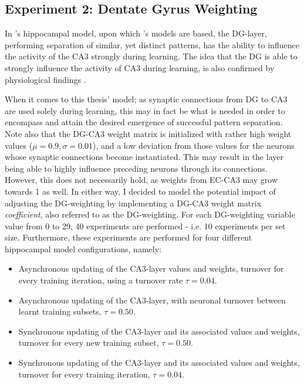 \subsection{Experiment 2: Dentate Gyrus Weighting}

In \citeauthor{Wakagi2008}'s \citeyear{Wakagi2008} hippocampal model, upon which \citeauthor{Hattori2010}'s \citeyear{Hattori2010, Hattori2014} models are based, the DG-layer, performing separation of similar, yet distinct patterns, has the ability to influence the activity of the CA3 strongly during learning. The idea that the DG is able to strongly influence the activity of CA3 during learning, is also confirmed by physiological findings \citep{Rolls1998chpt6}. 

When it comes to this thesis' model; as synaptic connections from DG to CA3 are used solely during learning, this may in fact be what is needed in order to encompass and attain the desired emergence of successful pattern separation. Note also that the DG-CA3 weight matrix is initialized with rather high weight values ($\mu=0.9, \sigma=0.01$), and a low deviation from those values for the neurons whose synaptic connections become instantiated. This may result in the layer being able to highly influence preceding neurons through its connections. However, this does not necessarily hold, as weights from EC-CA3 may grow towards 1 as well. In either way, I decided to model the potential impact of adjusting the DG-weighting by implementing a DG-CA3 weight matrix \textit{coefficient}, also referred to as the DG-weighting. For each DG-weighting variable value from 0 to 29, 40 experiments are performed - i.e. 10 experiments per set size. Furthermore, these experiments are performed for four different hippocampal model configurations, namely:

\begin{itemize}  
\item Asynchronous updating of the CA3-layer values and weights, turnover for every training iteration, using a turnover rate $\tau=0.04$.
\item Asynchronous updating of the CA3-layer, with neuronal turnover between learnt training subsets, $\tau=0.50$.
\item Synchronous updating of the CA3-layer and its associated values and weights, turnover for every new training subset, $\tau=0.50$.
\item Synchronous updating of the CA3-layer and its associated values and weights, turnover for every training iteration, $\tau=0.04$.
\end{itemize}

